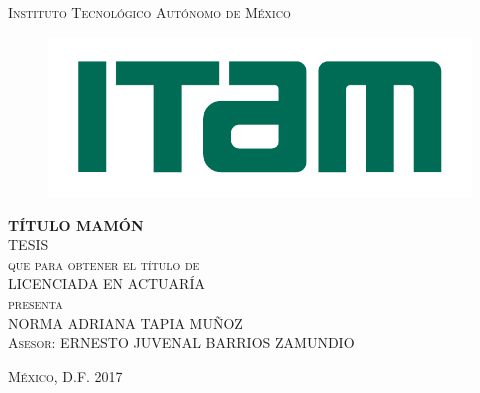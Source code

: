 \documentclass[11pt]{book}
\begin{document}
	


	
	\begin{titlepage}
		\begin{center}
			
			\textsc{\Large Instituto Tecnológico Autónomo de México}\\[4em]
			
			\begin{figure}[h]
				\begin{center}
					\includegraphics[scale=1]{itam}
				\end{center}
			\end{figure}
			
			\vspace{4em}
			
			\textsc{\huge \textbf{TÍTULO MAMÓN}}\\[4em]
			
			\textsc{\large TESIS}\\[1em]
			
			\textsc{que para obtener el título de}\\[1em]
			
			\textsc{LICENCIADA EN ACTUARÍA}\\[1em]
			
			\textsc{presenta}\\[1em]
			
			\textsc{\Large NORMA ADRIANA TAPIA MUÑOZ}\\[1em]
			
			\textsc{\large Asesor: ERNESTO JUVENAL BARRIOS ZAMUNDIO}
			
		\end{center}
		
		\vspace*{\fill}
		\textsc{México, D.F. \hspace*{\fill} 2017}
		
	\end{titlepage}
	
\end{document}
